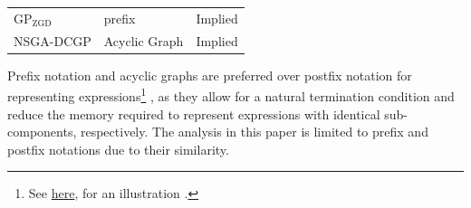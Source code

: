 \documentclass[runningheads]{llncs}
\begin{document}
\begin{table}
\begin{tabular*}{\textwidth}{lll}
$\mathrm{GP}_{\mathrm{ZGD}}$ \cite{10.1145/3377930.3390237} & prefix & Implied\\ %
NSGA-DCGP \cite{izzo2016differentiable} & Acyclic Graph & Implied \\%
\hline 
\end{tabular*}
\end{table}

Prefix notation and acyclic graphs are preferred over postfix notation for representing expressions\footnote{See \href{https://github.com/edfink234/Alpha-Zero-Symbolic-Regression/blob/3f384098ef19681f2de23410cc1375b01ddb28b8/Figure_1/pub_freqs.pdf}{here}, for an illustration \cite{cholewiak2021scholarly}.} \cite{defranca2023interpretable}, as they allow for a natural termination condition and reduce the memory required to represent expressions with identical sub-components, respectively. The analysis in this paper is limited to prefix and postfix notations due to their similarity.
\end{document}
